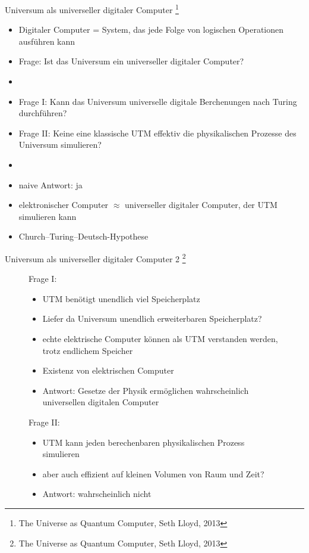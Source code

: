 \documentclass[aspectratio=1610, 9pt]{beamer}
\begin{document}
\begin{frame}{Universum als universeller digitaler Computer \footnote[8]{The Universe as Quantum Computer, Seth Lloyd, 2013}}
  \begin{itemize}
    \item Digitaler Computer = System, das jede Folge von logischen Operationen ausführen kann
    \item Frage: Ist das Universum ein universeller digitaler Computer?
    \item[]
    \item[\rightarrow] Frage I: Kann das Universum universelle digitale Berchenungen nach Turing durchführen?
    \item[\rightarrow] Frage II: Keine eine klassische UTM effektiv die physikalischen Prozesse des Universum simulieren?
    \item[]
    \item naive Antwort: ja
    \item elektronischer Computer $\approx$ universeller digitaler Computer, der UTM simulieren kann
    \item Church–Turing–Deutsch-Hypothese
  \end{itemize}

\end{frame}

\begin{frame}{Universum als universeller digitaler Computer 2 \footnote[8]{The Universe as Quantum Computer, Seth Lloyd, 2013}}
  \begin{figure}
    \begin{minipage}{0.49\textwidth}
      Frage I:
      \begin{itemize}
        \item UTM benötigt unendlich viel Speicherplatz
        \item Liefer da Universum unendlich erweiterbaren Speicherplatz?
        \item echte elektrische Computer können als UTM verstanden werden, trotz endlichem Speicher
        \item Existenz von elektrischen Computer
        \item[\rightarrow] Antwort: Gesetze der Physik ermöglichen wahrscheinlich universellen digitalen Computer
      \end{itemize}
    \end{minipage}
    \hfill
    \begin{minipage}{0.49\textwidth}
      Frage II:
      \begin{itemize}
        \item UTM kann jeden berechenbaren physikalischen Prozess simulieren
        \item aber auch effizient auf kleinen Volumen von Raum und Zeit?
        \item[\rightarrow] Antwort: wahrscheinlich nicht
      \end{itemize}
    \end{minipage}
  \end{figure}
\end{frame}
\end{document}
